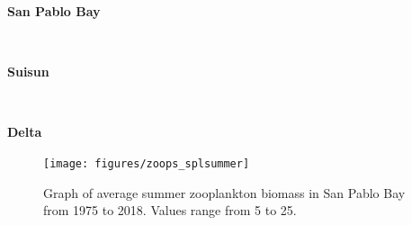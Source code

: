 \documentclass[
]{book}
\begin{document}
\begin{panel-grid}

\begin{columns-nocenter}

\begin{column800}

\textbf{San Pablo Bay}

\end{column800}

\begin{column40}

~

\end{column40}

\begin{column800}

\textbf{Suisun}

\end{column800}

\begin{column40}

~

\end{column40}

\begin{column800}

\textbf{Delta}

\end{column800}

\end{columns-nocenter}

\begin{columns-nocenter}

\begin{column800}

\begin{expand}

\begin{figure}
\texttt{[image: figures/zoops\_splsummer]} \caption{Graph of average summer zooplankton biomass in San Pablo Bay from 1975 to 2018. Values range from 5 to 25.}\label{fig:unnamed-chunk-70}
\end{figure}

\end{expand}

\end{column800}

\begin{column40}

~

\end{column40}


\end{columns-nocenter}
\end{panel-grid}
\end{document}
